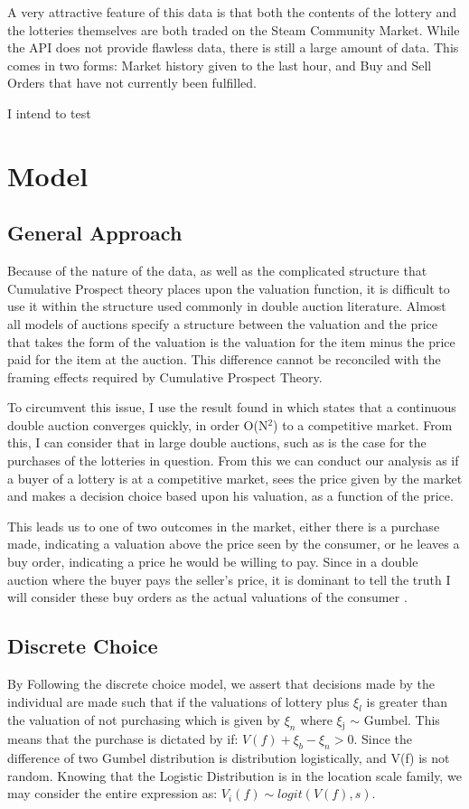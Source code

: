 \documentclass[11pt]{article}
\begin{document}
A very attractive feature of this data is that both the contents of
the lottery and the lotteries themselves are both traded on the Steam
Community Market. While the API does not provide flawless data, there
is still a large amount of data. This comes in two forms: Market
history given to the last hour, and Buy and Sell Orders that have not
currently been fulfilled.

I intend to test 

\section{Model}
\label{sec-2}
\subsection{General Approach}
\label{sec-2-1}

Because of the nature of the data, as well as the complicated
structure that Cumulative Prospect theory places upon the valuation
function, it is difficult to use it within the structure used commonly
in double auction literature. Almost all models of auctions specify a
structure between the valuation and the price that takes the form of
the valuation is the valuation for the item minus the price paid for
the item at the auction. This difference cannot be reconciled with the
framing effects required by Cumulative Prospect Theory.

To circumvent this issue, I use the result found in \cite{Efficiency}
which states that a continuous double auction converges quickly, in
order O(N$^{\text{2}}$) to a competitive market. From this, I can consider that in
large double auctions, such as is the case for the purchases of the
lotteries in question. From this we can conduct our analysis as if a
buyer of a lottery is at a competitive market, sees the price given by
the market and makes a decision choice based upon his valuation, as a
function of the price. 

This leads us to one of two outcomes in the market, either there is a
purchase made, indicating a valuation above the price seen by the
consumer, or he leaves a buy order, indicating a price he would be
willing to pay. Since in a double auction where the buyer pays the
seller's price, it is dominant to tell the truth I will consider these
buy orders as the actual valuations of the consumer \cite{PriceDataOnly}. 


\subsection{Discrete Choice}
\label{sec-2-2}
By Following the discrete choice model, we assert that decisions made
by the individual are made such that if the valuations of lottery plus
$\xi_l$ is greater than the valuation of not purchasing which is given by
$\xi_n$ where $\xi$$_{\text{j}}$ $\sim$ Gumbel. This means that the purchase is dictated
by if: $V(f) + \xi_b - \xi_n > 0$. Since the difference of two Gumbel
distribution is distribution logistically, and V(f) is not
random. Knowing that the Logistic Distribution is in the location
scale family, we may consider the entire expression as: $V_i(f) \sim logit( V(f), s )$.
\end{document}
